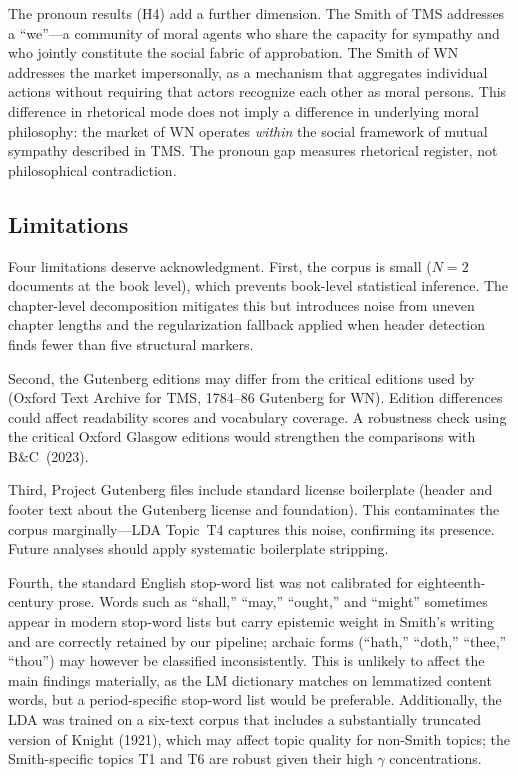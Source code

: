\documentclass[12pt,a4paper]{article}
\begin{document}
The pronoun results (H4) add a further dimension.
The Smith of TMS addresses a ``we''---a community of moral agents who
share the capacity for sympathy and who jointly constitute the social
fabric of approbation.
The Smith of WN addresses the market impersonally, as a mechanism that
aggregates individual actions without requiring that actors recognize
each other as moral persons.
This difference in rhetorical mode does not imply a difference in
underlying moral philosophy: the market of WN operates \textit{within}
the social framework of mutual sympathy described in TMS.
The pronoun gap measures rhetorical register, not philosophical
contradiction.

\subsection{Limitations}

Four limitations deserve acknowledgment.
First, the corpus is small ($N = 2$ documents at the book level), which
prevents book-level statistical inference.
The chapter-level decomposition mitigates this but introduces noise from
uneven chapter lengths and the regularization fallback applied when
header detection finds fewer than five structural markers.

Second, the Gutenberg editions may differ from the critical editions
used by \citeauthor{Ballandonne2023} (Oxford Text Archive for TMS,
1784--86 Gutenberg for WN).
Edition differences could affect readability scores and vocabulary
coverage.
A robustness check using the critical Oxford Glasgow editions would
strengthen the comparisons with B\&C~(2023).

Third, Project Gutenberg files include standard license boilerplate
(header and footer text about the Gutenberg license and foundation).
This contaminates the corpus marginally---LDA Topic~T4 captures this
noise, confirming its presence.
Future analyses should apply systematic boilerplate stripping.

Fourth, the standard English stop-word list was not calibrated for
eighteenth-century prose.
Words such as ``shall,'' ``may,'' ``ought,'' and ``might'' sometimes
appear in modern stop-word lists but carry epistemic weight in Smith's
writing and are correctly retained by our pipeline; archaic forms
(``hath,'' ``doth,'' ``thee,'' ``thou'') may however be classified
inconsistently.
This is unlikely to affect the main findings materially, as the LM
dictionary matches on lemmatized content words, but a period-specific
stop-word list would be preferable.
Additionally, the LDA was trained on a six-text corpus that includes a
substantially truncated version of Knight (1921), which may affect topic
quality for non-Smith topics; the Smith-specific topics T1 and T6 are
robust given their high $\gamma$ concentrations.
\end{document}
